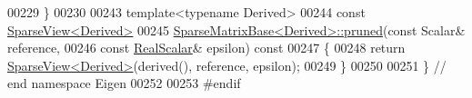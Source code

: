 \begin{DoxyCode}
00229 \}
00230 
00243 \textcolor{keyword}{template}<\textcolor{keyword}{typename} Derived>
00244 \textcolor{keyword}{const} \hyperlink{group___sparse_core___module_class_eigen_1_1_sparse_view}{SparseView<Derived>}
00245 \hyperlink{group___sparse_core___module_ac8d0414b56d9d620ce9a698c1b281e5d}{SparseMatrixBase<Derived>::pruned}(\textcolor{keyword}{const} Scalar& reference,
00246                                   \textcolor{keyword}{const} \hyperlink{group___sparse_core___module_aaec8ace6efb785c81d442931c3248d88}{RealScalar}& epsilon)\textcolor{keyword}{ const}
00247 \textcolor{keyword}{}\{
00248   \textcolor{keywordflow}{return} \hyperlink{group___sparse_core___module_class_eigen_1_1_sparse_view}{SparseView<Derived>}(derived(), reference, epsilon);
00249 \}
00250 
00251 \} \textcolor{comment}{// end namespace Eigen}
00252 
00253 \textcolor{preprocessor}{#endif}
\end{DoxyCode}
